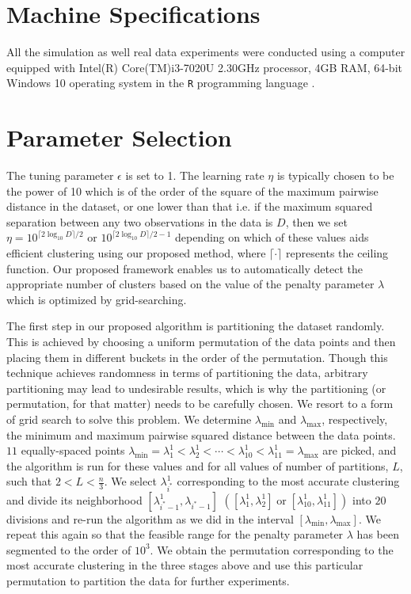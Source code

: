 \documentclass{article}
\begin{document}
\section{Machine Specifications}

All the simulation as well real data experiments were conducted using a computer equipped with Intel(R) Core(TM)i3-7020U 2.30GHz  processor, 4GB RAM, 64-bit Windows 10 operating  system in the \texttt{R} programming language \citep{R-lang}.


\section{Parameter Selection}
The tuning parameter $\epsilon$ is set to 1. The learning rate $\eta$ is typically chosen to be the power of 10 which is of the order of the square of the maximum pairwise distance in the dataset, or one lower than that i.e. if the maximum squared separation between any two observations in the data is $D$, then we set $\eta = 10 ^{\lceil 2\log_{10} D \rceil /2}$ or $10^{\lceil 2\log_{10} D \rceil /2-1}$ depending on which of these values aids efficient clustering using our proposed method, where $\lceil \cdot \rceil$ represents the ceiling function. Our proposed framework enables us to automatically detect the appropriate number of clusters based on the value of the penalty parameter $\lambda$ which is optimized by grid-searching.

The first step in our proposed algorithm is partitioning the dataset randomly. This is achieved by choosing a uniform permutation of the data points and then placing them in different buckets in the order of the permutation. Though this technique achieves randomness in terms of partitioning the data, arbitrary partitioning may lead to undesirable results, which is why the partitioning (or permutation, for that matter) needs to be carefully chosen. We resort to a form of grid search to solve this problem. We determine $\lambda_{\min}$ and $\lambda_{\max}$, respectively, the minimum and maximum pairwise squared distance between the data points. $11$ equally-spaced points $\lambda_{\min} =\lambda^1_1<\lambda^1_2< \cdots < \lambda^1_{10}<\lambda^1_{11}=\lambda_{\max}$ are picked, and the algorithm is run for these values and for all values of number of partitions, $L$, such that $2<L<\frac{n}{3}$. We select $\lambda^1_{i^*}$ corresponding to the most accurate clustering and divide its neighborhood $[\lambda^1_{i^*-1},\lambda_{i^*-1}]$  $\left([\lambda^1_1,\lambda^1_2]\operatorname{ or }[\lambda^1_{10}, \lambda^1_{11}]\right)$ into $20$ divisions and re-run the algorithm as we did in the interval $[\lambda_{\min}, \lambda_{\max}]$. We repeat this again so that the feasible range for the penalty parameter $\lambda$ has been segmented to the order of $10^3$. We obtain the permutation corresponding to the most accurate clustering in the three stages above and use this particular permutation to partition the data for further experiments.
\end{document}

